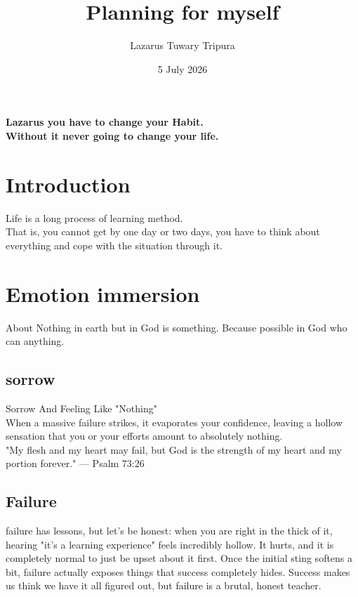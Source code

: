 \documentclass{article}%
\title{Planning for myself}
\author{Lazarus Tuwary Tripura}
\date{5 July 2026}
\begin{document}
\maketitle
\vspace{-8mm}
\begin{center}
    \textbf{Lazarus you have to change your Habit. \\
    Without it never going to change your life.}
\end{center}


\section{Introduction}

Life is a long process of learning method. \\ That is, you cannot get by one day or two days,
you have to think about everything and cope with the situation through it.
\section{Emotion immersion}
About Nothing in earth but in God is something. Because possible in God who can anything.
\subsection{sorrow}

\small{Sorrow And Feeling Like "Nothing"\\
When a massive failure strikes, it evaporates your confidence, leaving a hollow sensation that you or your efforts amount to absolutely nothing. }
\\
\huge
"My flesh and my heart may fail, but God is the strength of my heart and my portion forever."
— Psalm 73:26
\small
\subsection{Failure}
failure has lessons, but let’s be honest: when you are right in the thick of it, hearing "it’s a learning experience" feels incredibly hollow. It hurts, and it is completely normal to just be upset about it first. Once the initial sting softens a bit, failure actually exposes things that success completely hides. Success makes us think we have it all figured out, but failure is a brutal, honest teacher.
\end{document}
